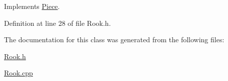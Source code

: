 Implements \hyperlink{class_piece_a4c717dfd8c910e2088bee2c4c6792c10}{Piece}.



Definition at line 28 of file Rook.\+h.



The documentation for this class was generated from the following files\+:\begin{DoxyCompactItemize}
\item 
\hyperlink{_rook_8h}{Rook.\+h}\item 
\hyperlink{_rook_8cpp}{Rook.\+cpp}\end{DoxyCompactItemize}
